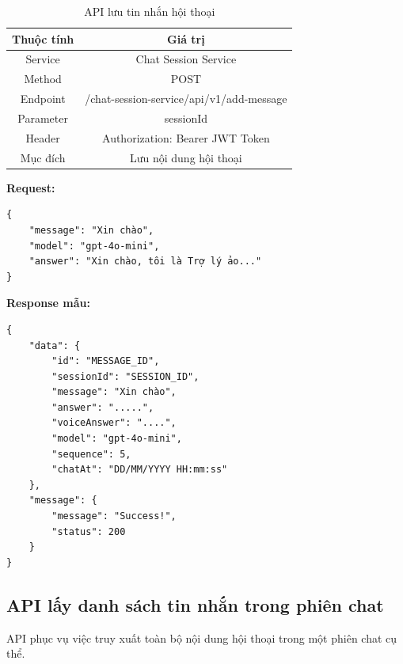 \documentclass[../DoAn.tex]{subfiles}
\begin{document}
\begin{table}[H]
    \centering
    \renewcommand{\arraystretch}{1.33}
    \begin{tabular}{|c|c|}
        \hline
        \textbf{Thuộc tính} & \textbf{Giá trị}                         \\
        \hline
        Service             & Chat Session Service                     \\
        \hline
        Method              & POST                                     \\
        \hline
        Endpoint            & /chat-session-service/api/v1/add-message \\
        \hline
        Parameter           & sessionId                                \\
        \hline
        Header              & Authorization: Bearer JWT Token          \\
        \hline
        Mục đích            & Lưu nội dung hội thoại                   \\
        \hline
    \end{tabular}
    \caption{API lưu tin nhắn hội thoại}

\end{table}



\textbf{Request:}
\begin{verbatim}
{
    "message": "Xin chào",
    "model": "gpt-4o-mini",
    "answer": "Xin chào, tôi là Trợ lý ảo..."
}
\end{verbatim}

\textbf{Response mẫu:}
\begin{verbatim}
{
    "data": {
        "id": "MESSAGE_ID",
        "sessionId": "SESSION_ID",
        "message": "Xin chào",
        "answer": ".....",
        "voiceAnswer": "....",
        "model": "gpt-4o-mini",
        "sequence": 5,
        "chatAt": "DD/MM/YYYY HH:mm:ss"
    },
    "message": {
        "message": "Success!",
        "status": 200
    }
}
\end{verbatim}
\clearpage

\subsection{API lấy danh sách tin nhắn trong phiên chat}
API phục vụ việc truy xuất toàn bộ nội dung hội thoại trong một phiên chat cụ thể.
\end{document}

